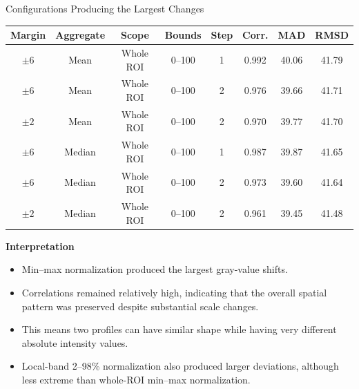 \documentclass[aspectratio=169]{beamer}
\begin{document}
\begin{frame}{Configurations Producing the Largest Changes}

\scriptsize

\begin{table}
\centering
\begin{tabular}{cccccccc}
\toprule
Margin &
Aggregate &
Scope &
Bounds &
Step &
Corr. &
MAD &
RMSD\\
\midrule
$\pm6$ & Mean & Whole ROI & 0--100 & 1 & 0.992 & 40.06 & 41.79\\
$\pm6$ & Mean & Whole ROI & 0--100 & 2 & 0.976 & 39.66 & 41.71\\
$\pm2$ & Mean & Whole ROI & 0--100 & 2 & 0.970 & 39.77 & 41.70\\
$\pm6$ & Median & Whole ROI & 0--100 & 1 & 0.987 & 39.87 & 41.65\\
$\pm6$ & Median & Whole ROI & 0--100 & 2 & 0.973 & 39.60 & 41.64\\
$\pm2$ & Median & Whole ROI & 0--100 & 2 & 0.961 & 39.45 & 41.48\\
\bottomrule
\end{tabular}
\end{table}

\vspace{0.25cm}

\textbf{Interpretation}

\begin{itemize}
    \item Min--max normalization produced the largest gray-value shifts.
    \item Correlations remained relatively high, indicating that the overall
    spatial pattern was preserved despite substantial scale changes.
    \item This means two profiles can have similar shape while having very
    different absolute intensity values.
    \item Local-band 2--98\% normalization also produced larger deviations,
    although less extreme than whole-ROI min--max normalization.
\end{itemize}

\end{frame}
\end{document}
